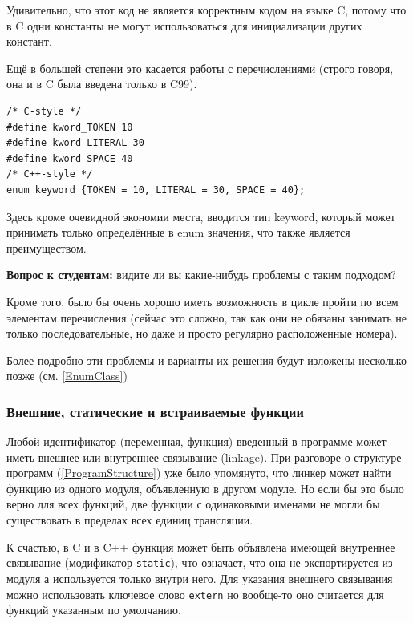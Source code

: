 \documentclass[a4paper,12pt,oneside]{article}
\newif\ifanswers
\begin{document}
Удивительно, что этот код не является корректным кодом на языке C, потому что в C одни константы не могут использоваться для инициализации других констант.

Ещё в большей степени это касается работы с перечислениями (строго говоря, она и в C была введена только в C99).

\begin{lstlisting}
/* C-style */
#define kword_TOKEN 10
#define kword_LITERAL 30
#define kword_SPACE 40
/* C++-style */
enum keyword {TOKEN = 10, LITERAL = 30, SPACE = 40};
\end{lstlisting}

Здесь кроме очевидной экономии места, вводится тип keyword, который может принимать только определённые в enum значения, что также является преимуществом.

\textbf{Вопрос к студентам:} видите ли вы какие-нибудь проблемы с таким подходом?

\ifanswers
Возможный ответ: да, символьное имя \lstinline!TOKEN! может конфликтовать с другим перечислением.
\fi

Кроме того, было бы очень хорошо иметь возможность в цикле пройти по всем элементам перечисления (сейчас это сложно, так как они не обязаны занимать не только последовательные, но даже и просто регулярно расположенные номера).

Более подробно эти проблемы и варианты их решения будут изложены несколько позже (см. \ref{EnumClass})

\subsubsection{Внешние, статические и встраиваемые функции}\label{Inline}

Любой идентификатор (переменная, функция) введенный в программе может иметь внешнее или внутреннее связывание (linkage). При разговоре о структуре программ (\ref{ProgramStructure}) уже было упомянуто, что линкер может найти функцию из одного модуля, объявленную в другом модуле. Но если бы это было верно для всех функций, две функции с одинаковыми именами не могли бы существовать в пределах всех единиц трансляции. 

К счастью, в C и в C++ функция может быть объявлена имеющей внутреннее связывание (модификатор \lstinline!static!), что означает, что она не экспортируется из модуля а используется только внутри него. Для указания внешнего связывания можно использовать ключевое слово \lstinline!extern! но вообще-то оно считается для функций указанным по умолчанию.
\end{document}
